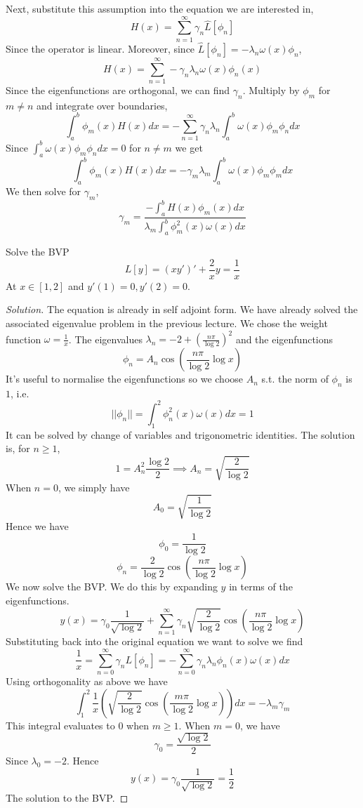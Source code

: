 Next, substitute this assumption into the equation we are interested in,
\[H(x)= \sum_{n=1}^{\infty} \gamma_n \hat{L}[\phi_n]\]
Since the operator is linear. Moreover, since $\hat{L}[\phi_n]=-\lambda_n\omega(x)\phi_n$,
\[H(x)= \sum_{n=1}^{\infty} -\gamma_n\lambda_n\omega(x)\phi_n(x)\]
Since the eigenfunctions are orthogonal, we can find $\gamma_n$. Multiply by $\phi_m$ for
$m\neq n$ and integrate over boundaries,
\[\int_a^b \phi_m(x)H(x)dx = -\sum_{n=1}^{\infty} \gamma_n\lambda_n
\int_a^b\omega(x)\phi_m\phi_n dx\]
Since $\int_a^b \omega(x)\phi_m\phi_n dx=0$ for $n\neq m$ we get 
\[\int_a^b \phi_m(x)H(x)dx = -\gamma_m\lambda_m
\int_a^b\omega(x)\phi_m\phi_m dx\]
We then solve for $\gamma_m$,
\[ \gamma_m = \frac{-\int_a^bH(x)\phi_m(x) dx}{\lambda_m\int_a^b\phi_m^2(x)\omega(x)dx}\]


\begin{example}
  Solve the BVP
  \[L[y]=(xy')' + \frac{2}{x}y = \frac{1}{x}\]
  At $x\in [1,2]$ and $y'(1)=0, y'(2)=0$.
\end{example}
\begin{proof}[Solution]
  The equation is already in self adjoint form. We have already solved the associated
  eigenvalue problem in the previous lecture. We chose the weight function
  $\omega=\frac{1}{x}$. The eigenvalues $\lambda_n=-2+\left( \frac{n\pi}{\log 2}
  \right)^2$ and the eigenfunctions
  \[\phi_{n}= A_n\cos \left( \frac{n\pi}{\log 2} \log x \right)\]
  It's useful to normalise the eigenfunctions so we choose $A_n$ s.t. the norm of $\phi_n$
  is $1$, i.e. 
  \[||\phi_n||=\int_1^2 \phi_n^2(x)\omega(x) dx = 1\]
  It can be solved by change of variables and trigonometric identities. The solution is,
  for $n\geq 1$,
  \[1=A_n^2 \frac{\log 2}{2} \implies A_n= \sqrt{\frac{2}{\log 2}}\]
  When $n=0$, we simply have 
  \[A_0= \sqrt{\frac{1}{\log 2}}\]
  Hence we have
  \[\phi_0=\frac{1}{\log 2}\]
  \[\phi_n = \frac{2}{\log 2} \cos\left( \frac{n\pi}{\log 2} \log x \right)\]
  We now solve the BVP. We do this by expanding $y$ in terms of the eigenfunctions.
  \[y(x) = \gamma_0 \frac{1}{\sqrt{\log 2}} + \sum_{n=1}^{\infty} \gamma_n
  \sqrt{\frac{2}{\log 2}} \cos\left( \frac{n\pi}{\log 2}\log x \right)\]
  Substituting back into the original equation we want to solve we find
  \[\frac{1}{x} = \sum_{n=0}^{\infty}\gamma_n L[\phi_n] = -
  \sum_{n=0}^{\infty}\gamma_n\lambda_n \phi_n(x)\omega(x) dx\]
  Using orthogonality as above we have
  \[\int_1^2 \frac{1}{x} \left( \sqrt{\frac{2}{\log 2}}\cos\left( \frac{m\pi}{\log 2}\log
  x\right) \right)dx  = -\lambda_m\gamma_m\]
  This integral evaluates to $0$ when $m\geq 1$. When $m=0$, we have 
  \[\gamma_0=\frac{\sqrt{\log 2}}{2}\]
  Since $\lambda_0=-2$.
  Hence 
  \[y(x)= \gamma_0 \frac{1}{\sqrt{\log 2}}= \frac{1}{2}\]
  The solution to the BVP.
\end{proof}
